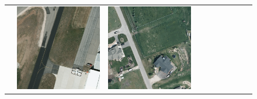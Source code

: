 \begin{figure}[h!]
\begin{tabularx}{\textwidth}{c|*{9}{X}}
    &  \includegraphics[trim={650pt 120pt 170pt 720pt},clip,width=\linewidth]{images/015Results/01abb_vs_obb/comp_images/ground_truth_obb/487.png}
    & \includegraphics[trim={230pt 200pt 680pt 725pt},clip,width=\linewidth]{images/015Results/01abb_vs_obb/comp_images/ground_truth_obb/509.png}

\end{tabularx}
\end{figure}
